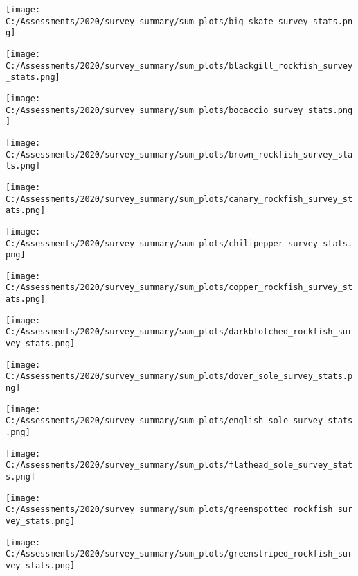 \documentclass[12pt,]{article}
\begin{document}
\texttt{[image: C:/Assessments/2020/survey\_summary/sum\_plots/big\_skate\_survey\_stats.png]}
\FloatBarrier  

\texttt{[image: C:/Assessments/2020/survey\_summary/sum\_plots/blackgill\_rockfish\_survey\_stats.png]}
\FloatBarrier  

\FloatBarrier

\texttt{[image: C:/Assessments/2020/survey\_summary/sum\_plots/bocaccio\_survey\_stats.png]}
\FloatBarrier  

\texttt{[image: C:/Assessments/2020/survey\_summary/sum\_plots/brown\_rockfish\_survey\_stats.png]}
\FloatBarrier  

\texttt{[image: C:/Assessments/2020/survey\_summary/sum\_plots/canary\_rockfish\_survey\_stats.png]}
\FloatBarrier  

\texttt{[image: C:/Assessments/2020/survey\_summary/sum\_plots/chilipepper\_survey\_stats.png]}
\FloatBarrier  

\texttt{[image: C:/Assessments/2020/survey\_summary/sum\_plots/copper\_rockfish\_survey\_stats.png]}
\FloatBarrier  

\FloatBarrier

\texttt{[image: C:/Assessments/2020/survey\_summary/sum\_plots/darkblotched\_rockfish\_survey\_stats.png]}
\FloatBarrier  

\texttt{[image: C:/Assessments/2020/survey\_summary/sum\_plots/dover\_sole\_survey\_stats.png]}
\FloatBarrier  

\texttt{[image: C:/Assessments/2020/survey\_summary/sum\_plots/english\_sole\_survey\_stats.png]}
\FloatBarrier  

\FloatBarrier

\texttt{[image: C:/Assessments/2020/survey\_summary/sum\_plots/flathead\_sole\_survey\_stats.png]}
\FloatBarrier  

\FloatBarrier

\texttt{[image: C:/Assessments/2020/survey\_summary/sum\_plots/greenspotted\_rockfish\_survey\_stats.png]}
\FloatBarrier  

\texttt{[image: C:/Assessments/2020/survey\_summary/sum\_plots/greenstriped\_rockfish\_survey\_stats.png]}
\FloatBarrier  
\end{document}
